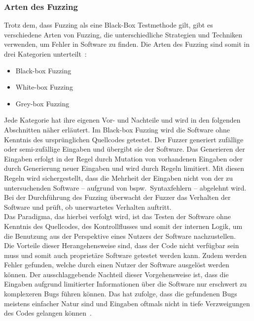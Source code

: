 
\subsubsection{Arten des Fuzzing}\label{subsubsec:arten-des-fuzzing}
Trotz dem, dass Fuzzing als eine Black-Box Testmethode gilt, gibt es verschiedene Arten von Fuzzing, die unterschiedliche
Strategien und Techniken verwenden, um Fehler in Software zu finden.
Die Arten des Fuzzing sind somit in drei Kategorien unterteilt~\cite{iot-fuzzing}:
\begin{itemize}
    \item Black-box Fuzzing
    \item White-box Fuzzing
    \item Grey-box Fuzzing
\end{itemize}
Jede Kategorie hat ihre eigenen Vor- und Nachteile und wird in den folgenden Abschnitten näher erläutert.\newline
Im Black-box Fuzzing wird die Software ohne Kenntnis des ursprünglichen Quellcodes getestet.
Der Fuzzer generiert zufällige oder semi-zufällige Eingaben und übergibt sie der Software.
Das Generieren der Eingaben erfolgt in der Regel durch Mutation von vorhandenen Eingaben oder durch Generierung neuer Eingaben
und wird durch Regeln limitiert.
Mit diesen Regeln wird sichergestellt, dass die Mehrheit der Eingaben nicht von der zu untersuchenden Software -- aufgrund
von bspw.\ Syntaxfehlern -- abgelehnt wird.
Bei der Durchführung des Fuzzing überwacht der Fuzzer das Verhalten der Software und prüft, ob unerwartetes Verhalten auftritt. \\
Das Paradigma, das hierbei verfolgt wird, ist das Testen der Software ohne Kenntnis des Quellcodes, des Kontrollflusses und somit der internen
Logik, um die Benutzung aus der Perspektive eines Nutzers der Software nachzustellen.\\
Die Vorteile dieser Herangehensweise sind, dass der Code nicht verfügbar sein muss und somit auch proprietäre Software getestet werden kann.
Zudem werden Fehler gefunden, welche durch einen Nutzer der Software ausgelöst werden können.
Der ausschlaggebende Nachteil dieser Vorgehensweise ist, dass die Eingaben aufgrund limitierter Informationen über die Software
nur erschwert zu komplexeren Bugs führen können.
Das hat zufolge, dass die gefundenen Bugs meistens einfacher Natur sind und Eingaben oftmals nicht in tiefe Verzweigungen des Codes
gelangen können~\cite{black-box-fuzzing}.\newline\newline
